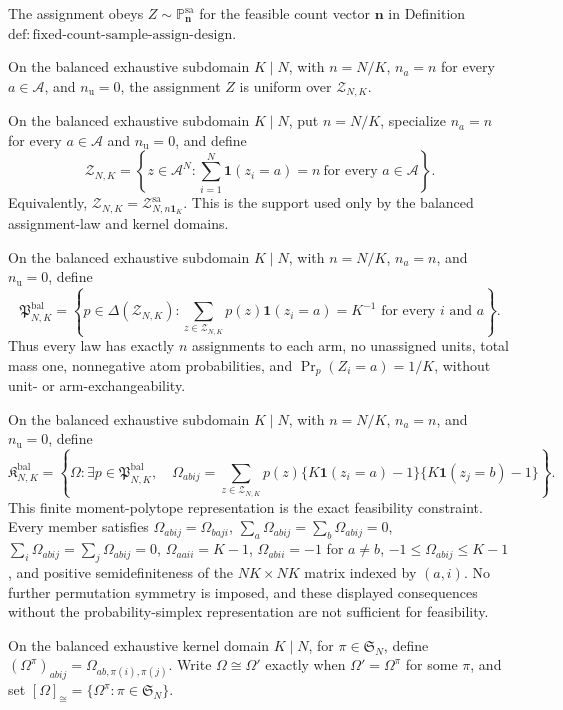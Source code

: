 The assignment obeys \(Z\sim\mathbb P_{\mathbf n}^{\mathrm{sa}}\) for the feasible count vector \(\mathbf n\) in Definition \(\mathrm{def{:}fixed\text{-}count\text{-}sample\text{-}assign\text{-}design}\).

On the balanced exhaustive subdomain \(K\mid N\), with \(n=N/K\), \(n_a=n\) for every \(a\in\mathcal A\), and \(n_{\mathrm u}=0\), the assignment \(Z\) is uniform over \(\mathcal Z_{N,K}\).

On the balanced exhaustive subdomain \(K\mid N\), put \(n=N/K\), specialize \(n_a=n\) for every \(a\in\mathcal A\) and \(n_{\mathrm u}=0\), and define
\[
\mathcal Z_{N,K}=\left\{z\in\mathcal A^N:\sum_{i=1}^N\mathbf 1(z_i=a)=n\ \text{for every }a\in\mathcal A\right\}.
\]
Equivalently, \(\mathcal Z_{N,K}=\mathcal Z_{N,n\mathbf 1_K}^{\mathrm{sa}}\). This is the support used only by the balanced assignment-law and kernel domains.

On the balanced exhaustive subdomain \(K\mid N\), with \(n=N/K\), \(n_a=n\), and \(n_{\mathrm u}=0\), define
\[
\mathfrak P^{\mathrm{bal}}_{N,K}=\left\{p\in\Delta(\mathcal Z_{N,K}):\sum_{z\in\mathcal Z_{N,K}}p(z)\mathbf 1(z_i=a)=K^{-1}\text{ for every }i\text{ and }a\right\}.
\]
Thus every law has exactly \(n\) assignments to each arm, no unassigned units, total mass one, nonnegative atom probabilities, and \(\Pr_p(Z_i=a)=1/K\), without unit- or arm-exchangeability.

On the balanced exhaustive subdomain \(K\mid N\), with \(n=N/K\), \(n_a=n\), and \(n_{\mathrm u}=0\), define
\[
\mathfrak K^{\mathrm{bal}}_{N,K}=\left\{\Omega:\exists p\in\mathfrak P^{\mathrm{bal}}_{N,K},\quad \Omega_{abij}=\sum_{z\in\mathcal Z_{N,K}}p(z)\{K\mathbf 1(z_i=a)-1\}\{K\mathbf 1(z_j=b)-1\}\right\}.
\]
This finite moment-polytope representation is the exact feasibility constraint. Every member satisfies \(\Omega_{abij}=\Omega_{baji}\), \(\sum_a\Omega_{abij}=\sum_b\Omega_{abij}=0\), \(\sum_i\Omega_{abij}=\sum_j\Omega_{abij}=0\), \(\Omega_{aaii}=K-1\), \(\Omega_{abii}=-1\) for \(a\ne b\), \(-1\leq\Omega_{abij}\leq K-1\), and positive semidefiniteness of the \(NK\times NK\) matrix indexed by \((a,i)\). No further permutation symmetry is imposed, and these displayed consequences without the probability-simplex representation are not sufficient for feasibility.

On the balanced exhaustive kernel domain \(K\mid N\), for \(\pi\in\mathfrak S_N\), define \((\Omega^{\pi})_{abij}=\Omega_{ab,\pi(i),\pi(j)}\). Write \(\Omega\cong\Omega'\) exactly when \(\Omega'=\Omega^{\pi}\) for some \(\pi\), and set \([\Omega]_{\cong}=\{\Omega^{\pi}:\pi\in\mathfrak S_N\}\).

